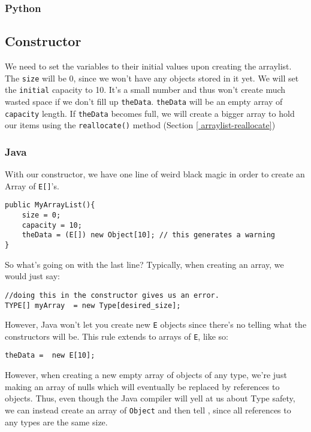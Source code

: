 \subsubsection{Python}


\subsection{Constructor}

We need to set the variables to their initial values upon creating the arraylist.
The \texttt{size} will be 0, since we won't have any objects stored in it yet.
We will set the \texttt{initial} capacity to 10.  
It's a small number and thus won't create much wasted space if we don't fill up \texttt{theData}.
\texttt{theData} will be an empty array of \texttt{capacity} length.
If \texttt{theData} becomes full, we will create a bigger array to hold our items using the \texttt{reallocate()} method (Section \ref{
arraylist-reallocate})  %


\subsubsection{Java}
With our constructor, we have one line of weird black magic in order to create an Array of \texttt{E[]}'s.
\begin{verbatim}
public MyArrayList(){
	size = 0;
	capacity = 10;
	theData = (E[]) new Object[10]; // this generates a warning
}
\end{verbatim}

So what's going on with the last line?
Typically, when creating an array, we would just say:

\begin{verbatim}
//doing this in the constructor gives us an error.
TYPE[] myArray  = new Type[desired_size];
\end{verbatim}

However, Java won't let you create new \texttt{E} objects since there's no telling what the constructors will be.  This rule extends to arrays of \texttt{E}, like so:
\begin{verbatim}
theData =  new E[10];
\end{verbatim}

However, when creating a new empty array of objects of any type, we're just making an array of nulls which will eventually be replaced by references to objects.  Thus, even though the Java compiler will yell at us about Type safety, we can instead create an array of \texttt{Object} and then tell , since all references to any types are the same size.

